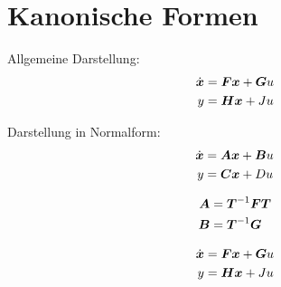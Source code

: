 \setcounter{section}{10}
\section{Kanonische Formen}
\begin{tcolorbox}[colback=white!10!white,colframe=green!60!black,title=Definition + Umrechnung]
\begin{minipage}{.45\textwidth}
    Allgemeine Darstellung:
    \begin{align*}
    \dot{\boldsymbol{x}} &= \boldsymbol{Fx} + \boldsymbol{G}u\\
    y &= \boldsymbol{Hx} +Ju
    \end{align*}
\end{minipage}
\begin{minipage}{.45\textwidth}
Darstellung in Normalform:
\begin{align*}
\dot{\boldsymbol{x}} &= \boldsymbol{Ax} + \boldsymbol{B}u\\
y &= \boldsymbol{Cx} +Du
\end{align*}
\end{minipage}
\tcblower
\begin{minipage}{.45\textwidth}
    \begin{align*}
    \boldsymbol{A} &= \boldsymbol{T}^{-1}\boldsymbol{F}\boldsymbol{T}\\
 \boldsymbol{B} &= \boldsymbol{T}^{-1}\boldsymbol{G}
    \end{align*}
\end{minipage}
\begin{minipage}{.45\textwidth}
    \begin{align*}
        \dot{\boldsymbol{x}} &= \boldsymbol{Fx} + \boldsymbol{G}u\\
        y &= \boldsymbol{Hx} +Ju
    \end{align*}
\end{minipage}

\end{tcolorbox}



 


